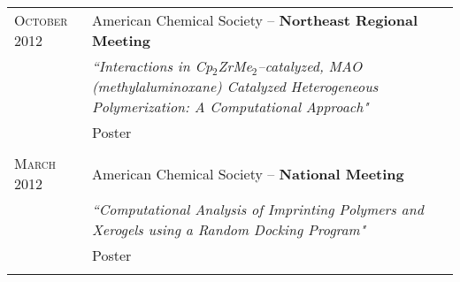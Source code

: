 \documentclass[letterpaper,10pt]{article} %
\begin{document}
\begin{tabular}{R{3cm}|p{13cm}}
\textsc{October} 2012 & American Chemical Society -- \textbf{Northeast Regional Meeting} \\
& \small{\emph{``Interactions in Cp$_2$ZrMe$_2$--catalyzed, MAO (methylaluminoxane) Catalyzed Heterogeneous Polymerization: A Computational Approach"}} \\
& \small Poster \\
 \\


\textsc{March} 2012 & American Chemical Society -- \textbf{National Meeting} \\
& \small{\emph{``Computational Analysis of Imprinting Polymers and Xerogels using a Random Docking Program"}} \\
& \small Poster \\
 \\


\end{tabular}






\end{document}
